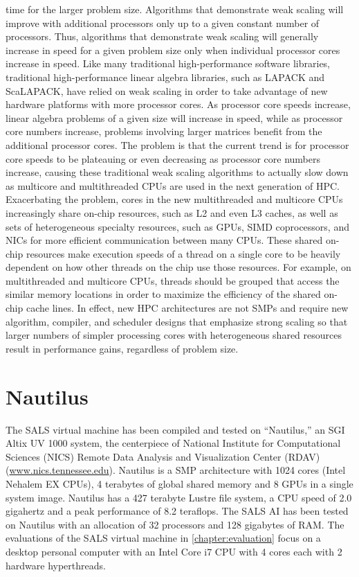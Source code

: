 time for the larger problem size.  Algorithms that demonstrate weak
scaling will improve with additional processors only up to a given
constant number of processors.  Thus, algorithms that demonstrate weak
scaling will generally increase in speed for a given problem size only
when individual processor cores increase in speed.  Like many
traditional high-performance software libraries, traditional
high-performance linear algebra libraries, such as LAPACK and
ScaLAPACK, have relied on weak scaling in order to take advantage of
new hardware platforms with more processor cores.  As processor core
speeds increase, linear algebra problems of a given size will increase
in speed, while as processor core numbers increase, problems involving
larger matrices benefit from the additional processor cores.  The
problem is that the current trend is for processor core speeds to be
plateauing or even decreasing as processor core numbers increase,
causing these traditional weak scaling algorithms to actually slow
down as multicore and multithreaded CPUs are used in the next
generation of HPC.  Exacerbating the problem, cores in the new
multithreaded and multicore CPUs increasingly share on-chip resources,
such as L2 and even L3 caches, as well as sets of heterogeneous
specialty resources, such as GPUs, SIMD coprocessors, and NICs for
more efficient communication between many CPUs.  These shared on-chip
resources make execution speeds of a thread on a single core to be
heavily dependent on how other threads on the chip use those
resources.  For example, on multithreaded and multicore CPUs, threads
should be grouped that access the similar memory locations in order to
maximize the efficiency of the shared on-chip cache lines.  In effect,
new HPC architectures are not SMPs and require new algorithm,
compiler, and scheduler designs that emphasize strong scaling so that
larger numbers of simpler processing cores with heterogeneous shared
resources result in performance gains, regardless of problem size.

\section{Nautilus}

The SALS virtual machine has been compiled and tested on ``Nautilus,''
an SGI Altix UV 1000 system, the centerpiece of National Institute for
Computational Sciences (NICS) Remote Data Analysis and Visualization
Center (RDAV) (\url{www.nics.tennessee.edu}).  Nautilus is a SMP
architecture with 1024 cores (Intel Nehalem EX CPUs), 4 terabytes of
global shared memory and 8 GPUs in a single system image.  Nautilus
has a 427 terabyte Lustre file system, a CPU speed of 2.0 gigahertz
and a peak performance of 8.2 teraflops.  The SALS AI has been tested
on Nautilus with an allocation of 32 processors and 128 gigabytes of
RAM.  The evaluations of the SALS virtual machine in
{\mbox{\autoref{chapter:evaluation}}} focus on a desktop personal
computer with an Intel Core i7 CPU with 4 cores each with 2 hardware
hyperthreads.


